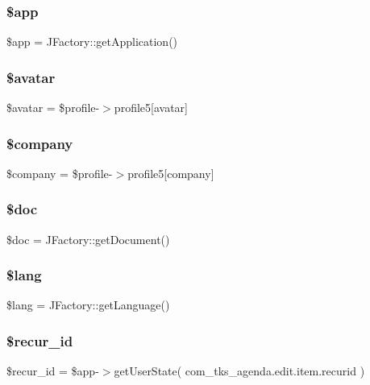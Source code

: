 \subsubsection{\$app}
{\footnotesize\ttfamily \$app = J\+Factory\+::get\+Application()}

\mbox{\label{edittmpl_8php_ac62167326fcdc762297fe76407218b55}} 
\subsubsection{\$avatar}
{\footnotesize\ttfamily \$avatar = \$profile-\/$>$profile5[\textquotesingle{}avatar\textquotesingle{}]}

\mbox{\label{edittmpl_8php_a3306bb3d7f99fc57bee9e96f928769d4}} 
\subsubsection{\$company}
{\footnotesize\ttfamily \$company = \$profile-\/$>$profile5[\textquotesingle{}company\textquotesingle{}]}

\mbox{\label{edittmpl_8php_afc5e9ce512cd97cf2e0e25bb20dcd39b}} 
\subsubsection{\$doc}
{\footnotesize\ttfamily \$doc = J\+Factory\+::get\+Document()}

\mbox{\label{edittmpl_8php_a7714b111b644017933931ec69a154102}} 
\subsubsection{\$lang}
{\footnotesize\ttfamily \$lang = J\+Factory\+::get\+Language()}

\mbox{\label{edittmpl_8php_aed426ca0f24ef496d83ef6d580ff395e}} 
\subsubsection{\$recur\+\_\+id}
{\footnotesize\ttfamily \$recur\+\_\+id = \$app-\/$>$get\+User\+State( \textquotesingle{}com\+\_\+tks\+\_\+agenda.\+edit.\+item.\+recurid\textquotesingle{} )}

